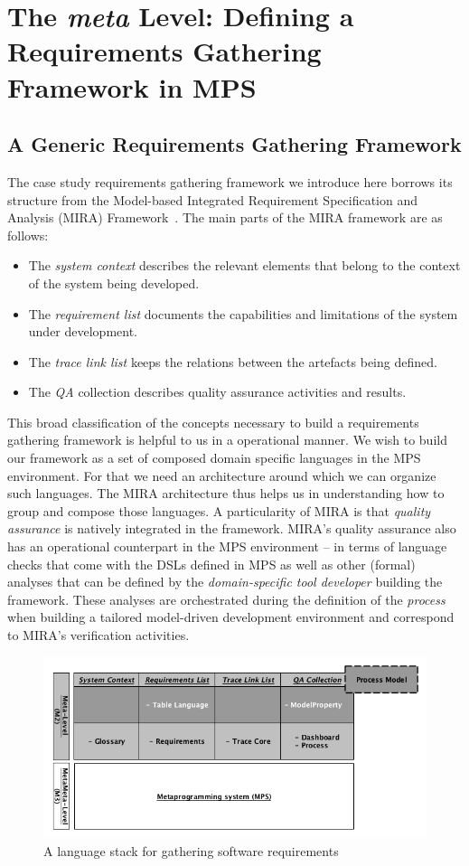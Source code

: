 \section{The \emph{meta} Level: Defining a Requirements Gathering Framework in
MPS}
\label{sec:meta}

\subsection{A Generic Requirements Gathering Framework}
\label{sec:generic_req_fram}

The case study requirements gathering framework we introduce here borrows its
structure from the Model-based Integrated Requirement Specification and Analysis (MIRA)
Framework~\cite{MIRA13}. The main parts of the MIRA framework are
as follows:
\begin{itemize}
  \item The \emph{system context} describes the relevant elements that belong
  to the context of the system being developed.
  \item The \emph{requirement list} documents the capabilities and limitations
  of the system under development.
  \item The \emph{trace link list} keeps the relations between the artefacts
  being defined.
  \item The \emph{QA} collection describes quality assurance activities and
  results.
\end{itemize}

This broad classification of the concepts necessary to build a requirements
gathering framework is helpful to us in a operational manner. We wish to build
our framework as a set of composed domain specific languages in the MPS
environment. For that we need an architecture around which we can organize such
languages. The MIRA architecture thus helps us in understanding how to group and
compose those languages. A particularity of MIRA is that \emph{quality
assurance} is natively integrated in the framework. MIRA's quality assurance
also has an operational counterpart in the MPS environment -- in terms of
language checks that come with the DSLs defined in MPS as well as other (formal)
analyses that can be defined by the \emph{domain-specific tool developer}
building the framework. These analyses are orchestrated during the definition of
the \emph{process} when building a tailored model-driven development environment
and correspond to MIRA's verification activities.

\begin{figure}[!h]
\centering
\includegraphics[width=.75\textwidth]{./figures/Fig2.png}
\caption{A language stack for gathering software requirements
}
\label{fig:meta_struct_reqs}
\end{figure}

